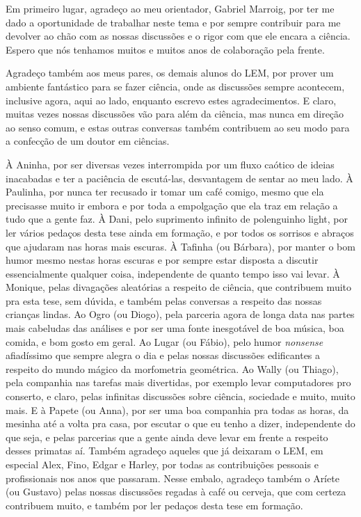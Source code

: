 \onehalfspacing

Em primeiro lugar, agradeço ao meu orientador, Gabriel Marroig, por ter me dado a oportunidade de trabalhar neste tema e por sempre contribuir para me devolver ao chão com as nossas discussões e o rigor com que ele encara a ciência. 
Espero que nós tenhamos muitos e muitos anos de colaboração pela frente.

Agradeço também aos meus pares, os demais alunos do LEM, por prover um ambiente fantástico para se fazer ciência, onde as discussões sempre acontecem, inclusive agora, aqui ao lado, enquanto escrevo estes agradecimentos. 
E claro, muitas vezes nossas discussões vão para além da ciência, mas nunca em direção ao senso comum, e estas outras conversas também contribuem ao seu modo para a confecção de um doutor em ciências.

À Aninha, por ser diversas vezes interrompida por um fluxo caótico de ideias inacabadas e ter a paciência de escutá-las, desvantagem de sentar ao meu lado.
À Paulinha, por nunca ter recusado ir tomar um café comigo, mesmo que ela precisasse muito ir embora e por toda a empolgação que ela traz em relação a tudo que a gente faz.
À Dani, pelo suprimento infinito de polenguinho light, por ler vários pedaços desta tese ainda em formação, e por todos os sorrisos e abraços que ajudaram nas horas mais escuras.
À Tafinha (ou Bárbara), por manter o bom humor mesmo nestas horas escuras e por sempre estar disposta a discutir essencialmente qualquer coisa, independente de quanto tempo isso vai levar.
À Monique, pelas divagações aleatórias a respeito de ciência, que contribuem muito pra esta tese, sem dúvida, e também pelas conversas a respeito das nossas crianças lindas.
Ao Ogro (ou Diogo), pela parceria agora de longa data nas partes mais cabeludas das análises e por ser uma fonte inesgotável de boa música, boa comida, e bom gosto em geral.
Ao Lugar (ou Fábio), pelo humor \emph{nonsense} afiadíssimo que sempre alegra o dia e pelas nossas discussões edificantes a respeito do mundo mágico da morfometria geométrica.
Ao Wally (ou Thiago), pela companhia nas tarefas mais divertidas, por exemplo levar computadores pro conserto, e claro, pelas infinitas discussões sobre ciência, sociedade e muito, muito mais.
E à Papete (ou Anna), por ser uma boa companhia pra todas as horas, da mesinha até a volta pra casa, por escutar o que eu tenho a dizer, independente do que seja, e pelas parcerias que a gente ainda deve levar em frente a respeito desses primatas aí.
Também agradeço aqueles que já deixaram o LEM, em especial Alex, Fino, Edgar e Harley, por todas as contribuições pessoais e profissionais nos anos que passaram.
Nesse embalo, agradeço também o Aríete (ou Gustavo) pelas nossas discussões regadas à café ou cerveja, que com certeza contribuem muito, e também por ler pedaços desta tese em formação.

